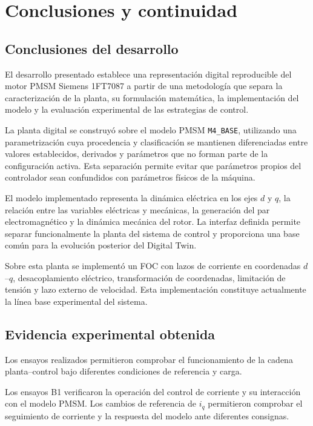 \section{Conclusiones y continuidad}

\subsection{Conclusiones del desarrollo}

El desarrollo presentado establece una representación digital reproducible del motor PMSM Siemens 1FT7087 a partir de una metodología que separa la caracterización de la planta, su formulación matemática, la implementación del modelo y la evaluación experimental de las estrategias de control.

La planta digital se construyó sobre el modelo PMSM \texttt{M4\_BASE}, utilizando una parametrización cuya procedencia y clasificación se mantienen diferenciadas entre valores establecidos, derivados y parámetros que no forman parte de la configuración activa. Esta separación permite evitar que parámetros propios del controlador sean confundidos con parámetros físicos de la máquina.

El modelo implementado representa la dinámica eléctrica en los ejes $d$ y $q$, la relación entre las variables eléctricas y mecánicas, la generación del par electromagnético y la dinámica mecánica del rotor. La interfaz definida permite separar funcionalmente la planta del sistema de control y proporciona una base común para la evolución posterior del Digital Twin.

Sobre esta planta se implementó un FOC con lazos de corriente en coordenadas $d$--$q$, desacoplamiento eléctrico, transformación de coordenadas, limitación de tensión y lazo externo de velocidad. Esta implementación constituye actualmente la línea base experimental del sistema.

\subsection{Evidencia experimental obtenida}

Los ensayos realizados permitieron comprobar el funcionamiento de la cadena planta--control bajo diferentes condiciones de referencia y carga.

Los ensayos B1 verificaron la operación del control de corriente y su interacción con el modelo PMSM. Los cambios de referencia de $i_q$ permitieron comprobar el seguimiento de corriente y la respuesta del modelo ante diferentes consignas.

